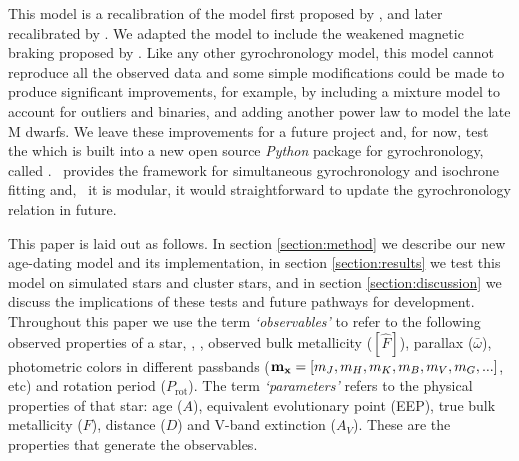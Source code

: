This model is a recalibration of the model first proposed by
\citet{barnes2003}, and later recalibrated by \citet{mamajek2008}.
We adapted the \citet{angus2015} model to include the weakened magnetic
braking proposed by \citet{vansaders2016}.
Like any other gyrochronology model, this model cannot reproduce all the
observed data and some simple modifications could be made to produce
significant improvements, for example, by including a mixture model to account
for outliers and binaries, and adding another power law to model the late M
dwarfs.
We leave these improvements for a future project and, for now, test the
\citet{angus2015} which is built into a new open source {\it Python} package
for gyrochronology, called \sd.
\sd\ provides the framework for simultaneous gyrochronology and isochrone
fitting and, \sd\ it is modular, it would straightforward to update the
gyrochronology relation in future.

This paper is laid out as follows.
In section \ref{section:method} we describe our new age-dating model and its
implementation, in section \ref{section:results} we test this model on
simulated stars and cluster stars, and in section \ref{section:discussion} we
discuss the implications of these tests and future pathways for development.
Throughout this paper we use the term {\it `observables'} to refer to the
following observed properties of a star, \teff, \logg, observed bulk
metallicity ($[\hat{F}]$), parallax ($\bar{\omega}$), photometric
colors in different passbands (${\bf m_x} = [m_J, m_H, m_K, m_B, m_V, m_G,
...]$, etc) and rotation period
($P_{\mathrm{rot}}$).
The term {\it `parameters'} refers to the physical properties of that star:
age ($A$), equivalent evolutionary point (EEP), true bulk metallicity ($F$),
distance ($D$) and V-band extinction ($A_V$).
These are the properties that generate the observables.
